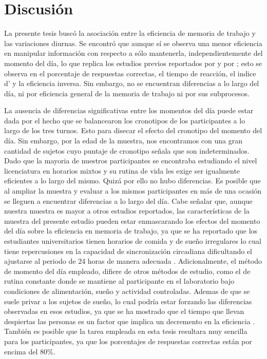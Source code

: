 \documentclass[12pt,letterpaper,final]{article}
\let\cite\cite %
\begin{document}
\section{Discusión}
La presente tesis buscó la asociación entre la eficiencia de memoria de trabajo y las variaciones diurnas. Se encontró que aunque sí se observa una menor eficiencia en manipular información con respecto a sólo mantenerla, independientemente del momento del día, lo que replica los estudios previos reportados por  y por ; esto se observa en el porcentaje de respuestas correctas, el tiempo de reacción, el indice d’ y la eficiencia inversa. Sin embargo, no se encuentran diferencias a lo largo del día, ni por eficiencia general de la memoria de trabajo ni por sus subprocesos. 

La ausencia de diferencias significativas entre los momentos del día puede estar dada por el hecho que se  balancearon los cronotipos de los participantes a lo largo de los tres turnos. Esto para disecar el efecto del cronotipo del momento del día. Sin embargo, por la edad de la muestra, nos encontramos con una gran cantidad de sujetos cuyo puntaje de cronotipo señala que son indeterminados. Dado que la mayoria de nuestros participantes se encontraba estudiando el nivel licenciatura en horarios mixtos y su rutina de vida les exige ser igualmente eficientes a lo largo del mismo. Quizá por ello no hubo diferencias. Es posible que al ampliar la muestra y evaluar a los mismos participantes en más de una ocasión se lleguen a encuentrar diferencias a lo largo del día. Cabe señalar que, aunque nuestra muestra es mayor a otros estudios reportados, las características de la muestra del presente estudio pueden estar enmascarando los efectos del momento del día sobre la eficiencia en memoria de trabajo, ya que se ha reportado que los estudiantes universitarios tienen horarios de comida y de sueño irregulares \cite{Lund2010} lo cual tiene repercusiones en la capacidad de sincronización circadiana  dificultando el ajustarse  al periodo de 24 horas de manera adecuada \cite{Harma1993}.
Adicionalmente, el método de momento del día empleado, difiere de otros métodos de estudio, como el de rutina constante donde se mantiene al participante en el laboratorio bajo condiciones de alimentación, sueño y actividad controladas. Ademas de que se suele privar a los sujetos de sueño, lo cual podría estar forzando las diferencias observadas en esos estudios, ya que se ha mostrado que el tiempo que llevan despiertas las personas es un factor que implica un decremento en la eficiencia \cite{Wright2002}. También es posible que la tarea empleada en esta tesis resultara muy sencilla para los participantes, ya que los porcentajes de respuestas correctas están por encima del 80\%.
\end{document}
